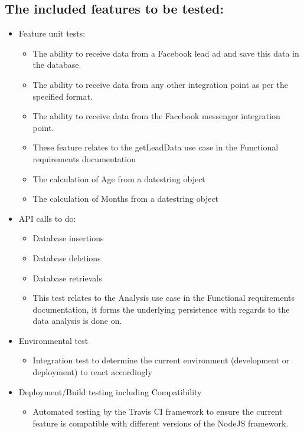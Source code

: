 \documentclass{article}
\begin{document}
\subsection{The included features to be tested:}
\begin{itemize}
\item Feature unit tests:
	\begin{itemize}
	\item The ability to receive data from a Facebook lead ad and save this data in the database.
	\item The ability to receive data from any other integration point as per the specified format.
	\item The ability to receive data from the Facebook messenger integration point.
	\item These feature relates to the getLeadData use case in the Functional requirements documentation
	\item The calculation of Age from a datestring object
	\item The calculation of Months from a datestring object
	\end{itemize}
	
\item API calls to do:
	\begin{itemize}
	\item Database insertions 
	\item Database deletions 
	\item Database retrievals 
	\item This test relates to the Analysis use case in the Functional requirements documentation, it forms the underlying persistence with regards to the data analysis is done on.
	\end{itemize}
\item Environmental test
	\begin{itemize}
	\item Integration test to determine the current environment (development or deployment) to react accordingly 
	\end{itemize}
\item Deployment/Build testing including Compatibility
		\begin{itemize}
	\item Automated testing by the Travis CI framework to ensure the current feature is compatible with different versions of the NodeJS framework. 
	\end{itemize}
\end{itemize}
\end{document}
